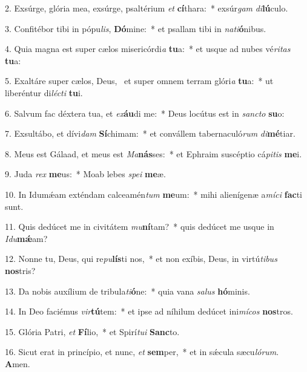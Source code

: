 2. Exsúrge, glória mea, exsúrge, psaltérium \textit{et} \textbf{cí}thara:~*  exsúr\textit{gam} \textit{di}\textbf{lú}culo.\

3. Confitébor tibi in pópu\textit{lis}, \textbf{Dó}mine:~*  et psallam tibi in \textit{na}\textit{ti}\textbf{ó}nibus.\

4. Quia magna est super cælos misericórdi\textit{a} \textbf{tu}a:~*  et usque ad nubes vé\textit{ri}\textit{tas} \textbf{tu}a:\

5. Exaltáre super cælos, Deus, \dag\  et super omnem terram glóri\textit{a} \textbf{tu}a:~*  ut liberéntur di\textit{léc}\textit{ti} \textbf{tu}i.\

6. Salvum fac déxtera tua, et \textit{ex}\textbf{áu}di me:~*  Deus locútus est in \textit{sanc}\textit{to} \textbf{su}o:\

7. Exsultábo, et dívi\textit{dam} \textbf{Sí}chimam:~*  et convállem tabernaculó\textit{rum} \textit{di}\textbf{mé}tiar.\

8. Meus est Gálaad, et meus est \textit{Ma}\textbf{nás}ses:~*  et Ephraim suscéptio cá\textit{pi}\textit{tis} \textbf{me}i.\

9. Juda \textit{rex} \textbf{me}us:~*  Moab lebes \textit{spe}\textit{i} \textbf{me}æ.\

10. In Idumǽam exténdam calceamén\textit{tum} \textbf{me}um:~*  mihi alienígenæ a\textit{mí}\textit{ci} \textbf{fac}ti sunt.\

11. Quis dedúcet me in civitátem \textit{mu}\textbf{ní}tam?~*  quis dedúcet me usque in \textit{I}\textit{du}\textbf{mǽ}am?\

12. Nonne tu, Deus, qui re\textit{pu}\textbf{lís}ti nos,~*  et non exíbis, Deus, in virtú\textit{ti}\textit{bus} \textbf{nos}tris?\

13. Da nobis auxílium de tribula\textit{ti}\textbf{ó}ne:~*  quia vana \textit{sa}\textit{lus} \textbf{hó}minis.\

14. In Deo faciémus \textit{vir}\textbf{tú}tem:~*  et ipse ad níhilum dedúcet ini\textit{mí}\textit{cos} \textbf{nos}tros.\

15. Glória Patri, \textit{et} \textbf{Fí}lio,~*  et Spirí\textit{tu}\textit{i} \textbf{Sanc}to.\

16. Sicut erat in princípio, et nunc, \textit{et} \textbf{sem}per,~*  et in sǽcula sæcu\textit{ló}\textit{rum}. \textbf{A}men.\

